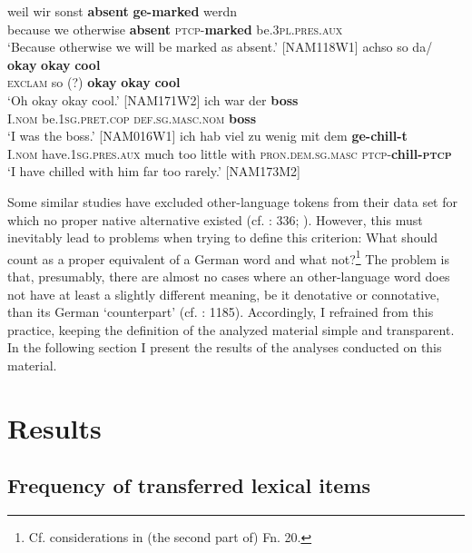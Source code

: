 \documentclass[output=paper]{langsci/langscibook}
\begin{document}
\ea
\label{ex:bracke:4}
\gll weil wir sonst \textbf{absent} \textbf{ge-marked} werdn\\
     because we otherwise \textbf{absent} \textsc{ptcp-}\textbf{marked} be.\textsc{3pl.pres.aux}\\
\glt `Because otherwise we will be marked as absent.' {[}NAM118W1{]}
\ex\label{ex:bracke:5}
	\gll achso so da/ \textbf{okay} \textbf{okay} \textbf{cool}     \\
     \textsc{exclam} so (?) \textbf{okay} \textbf{okay} \textbf{cool}\\
	\glt `Oh okay okay cool.' {[}NAM171W2{]}
\ex
\label{ex:bracke:6}
\gll ich war der \textbf{boss}\\
     I.\textsc{nom} be.\textsc{1sg.pret.cop} \textsc{def.sg.masc.nom} \textbf{boss}\\
\glt `I was the boss.' {[}NAM016W1{]}
\ex
\label{ex:bracke:7}
\gll ich hab viel zu wenig mit dem \textbf{ge-chill-t}  \\
     I.\textsc{nom} have.1\textsc{sg.pres.aux} much too little with \textsc{pron.dem.sg.masc} \textsc{ptcp-}\textbf{chill-\textsc{ptcp}}\\
\glt `I have chilled with him far too rarely.' {[}NAM173M2{]}
\z

Some similar studies have excluded other-language tokens from their data set for which no proper native alternative existed (cf. \citealt{zenner_sociolinguistic_2015}: 336; \citealt{calude_modelling_2017}). However, this must inevitably lead to problems when trying to define this criterion: What should count as a proper equivalent of a German word and what not?\footnote{Cf. considerations in (the second part of) Fn. 20.} The problem is that, presumably, there are almost no cases where an other-language word does not have at least a slightly different meaning, be it denotative or connotative, than its German ‘counterpart’ (cf. \citealt{zimmer_deutsch_2019}: 1185). Accordingly, I refrained from this practice, keeping the definition of the analyzed material simple and transparent. In the following section I present the results of the analyses conducted on this material.

 
\section{Results}
 \label{sec:bracke:5}
 
\subsection{Frequency of transferred lexical items}
 \label{sec:bracke:5.1}
 
\end{document}

